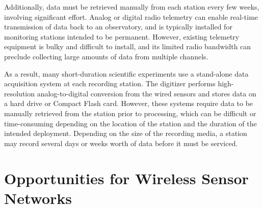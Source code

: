 Additionally, data must be retrieved manually from each station every few
weeks, involving significant effort. Analog or digital radio telemetry can
enable real-time transmission of data back to an observatory, and is
typically installed for monitoring stations intended to be permanent.
However, existing telemetry equipment is bulky and difficult to install, and
its limited radio bandwidth can preclude collecting large amounts of data
from multiple channels.

As a result, many short-duration scientific experiments use a stand-alone
data acquisition system at each recording station. The digitizer performs
high-resolution analog-to-digital conversion from the wired sensors and
stores data on a hard drive or Compact Flash card. However, these systems
require data to be manually retrieved from the station prior to processing,
which can be difficult or time-consuming depending on the location of the
station and the duration of the intended deployment. Depending on the size of
the recording media, a station may record several days or weeks worth of data
before it must be serviced.

\section{Opportunities for Wireless Sensor Networks}

